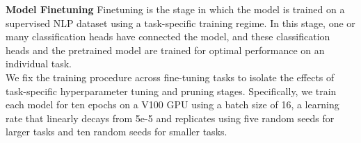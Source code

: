 \documentclass[10pt]{article}
\begin{document}
\textbf{Model Finetuning}
Finetuning is the stage in which the model is trained on a supervised NLP dataset using a task-specific training regime. In this stage, one or many classification heads have connected the model, and these classification heads and the pretrained model are trained for optimal performance on an individual task.\\
We fix the training procedure across fine-tuning tasks to isolate the effects of task-specific hyperparameter tuning and pruning stages. Specifically, we train each model for ten epochs on a V100 GPU using a batch size of 16, a learning rate that linearly decays from 5e-5 and replicates using five random seeds for larger tasks and ten random seeds for smaller tasks. \\
\begin{table*}[htb!]
    \centering
    \caption{Overall results on the impact of task and dataset of model pruning. Models trained for the general domain and pruned on the general domain can transfer at equal or better accuracy. Question Answering is the notable outlier as its small dataset size benefits from the sparse models as their pruned architecture prevents overfitting on small datasets.}
    \label{tab:full_datasets}
    \vspace{-1.2em}
\end{table*}
\end{document}
